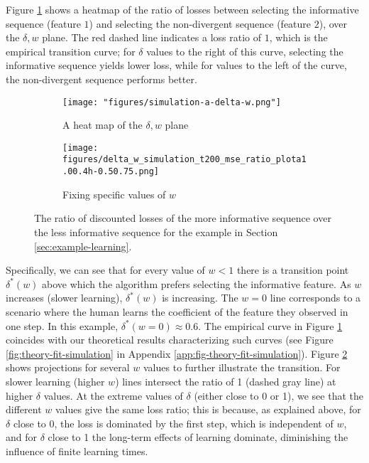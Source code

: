  Figure \ref{fig:w-delta-heatmap} shows a heatmap of the ratio of losses between selecting the informative sequence (feature $1$) and selecting the non-divergent sequence (feature $2$), over the $\delta, w$ plane. The red dashed line indicates a loss ratio of $1$, which is the empirical transition curve; for $\delta$ values to the right of this curve, selecting the informative sequence yields lower loss, while for values to the left of the curve, the non-divergent sequence performs better. 
\begin{figure}[h]
    \vspace{-10pt} %
    \centering
    \begin{subfigure}[b]{0.49\textwidth}
        \centering
        \texttt{[image: "figures/simulation-a-delta-w.png"]}
        \caption{
        \normalfont A heat map of the $\delta, w$ plane}
        \label{fig:w-delta-heatmap}
    \end{subfigure}
    \hfill
    \begin{subfigure}[b]{0.49\textwidth}
        \centering
        \texttt{[image: figures/delta\_w\_simulation\_t200\_mse\_ratio\_plota1.00.4h-0.50.75.png]}
        \caption{\normalfont Fixing specific values of $w$}
        \label{fig:w-delta-plot}
    \end{subfigure}
    \captionsetup{skip=2pt} %
    \caption{\normalfont The ratio of discounted losses of the more informative sequence over the less informative sequence for the example in Section \ref{sec:example-learning}.}
    \label{fig:main_figure}
    \vspace{-10pt} %
\end{figure}




Specifically, we can see that for every value of $w < 1$ there is a transition point $\delta^*(w)$ above which the algorithm prefers selecting the informative feature. As $w$ increases (slower learning), $\delta^*(w)$ is increasing. The $w=0$ line corresponds to a scenario where the human 
{learns the coefficient of the} feature they observed 
{in one step}. In this example, $\delta^*(w=0) \approx 0.6$. 
The empirical curve in Figure \ref{fig:w-delta-heatmap} 
coincides with our theoretical results characterizing such curves (see Figure \ref{fig:theory-fit-simulation} in Appendix \ref{app:fig-theory-fit-simulation}). Figure \ref{fig:w-delta-plot} shows projections for several $w$ values to further illustrate the transition. 
For slower learning (higher $w$) lines intersect the ratio of 1 (dashed gray line) at higher $\delta$ values.
At the extreme values of $\delta$
 (either close to 0 or 1), we see that the different $w$ values give the same loss ratio; this is because, as explained above, for $\delta$ close to 0, the loss is dominated by the first step, which is independent of $w$, and for $\delta$ close to 1 
the long-term effects of learning dominate, diminishing the influence of finite learning times.   



